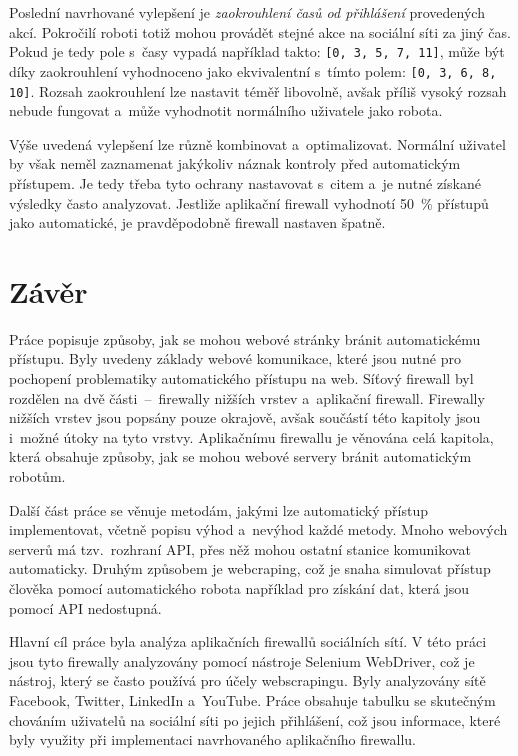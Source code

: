 Poslední navrhované vylepšení je \textit{zaokrouhlení časů od přihlášení} provedených akcí. Pokročilí roboti totiž mohou provádět stejné akce na sociální síti za jiný čas. Pokud je tedy pole s~časy vypadá například takto: \texttt{[0, 3, 5, 7, 11]}, může být díky zaokrouhlení vyhodnoceno jako ekvivalentní s~tímto polem: \texttt{[0, 3, 6, 8, 10]}. Rozsah zaokrouhlení lze nastavit téměř libovolně, avšak příliš vysoký rozsah nebude fungovat a~může vyhodnotit normálního uživatele jako robota.

Výše uvedená vylepšení lze různě kombinovat a~optimalizovat. Normální uživatel by však neměl zaznamenat jakýkoliv náznak kontroly před automatickým přístupem. Je tedy třeba tyto ochrany nastavovat s~citem a~je nutné získané výsledky často analyzovat. Jestliže aplikační firewall vyhodnotí 50~\% přístupů jako automatické, je pravděpodobně firewall nastaven špatně.

\chapter{Závěr}
Práce popisuje způsoby, jak se mohou webové stránky bránit automatickému přístupu. Byly uvedeny základy webové komunikace, které jsou nutné pro pochopení problematiky automatického přístupu na web. Síťový firewall byl rozdělen na dvě části~--~firewally nižších vrstev a~aplikační firewall. Firewally nižších vrstev jsou popsány pouze okrajově, avšak součástí této kapitoly jsou i~možné útoky na tyto vrstvy. Aplikačnímu firewallu je věnována celá kapitola, která obsahuje způsoby, jak se mohou webové servery bránit automatickým robotům.

Další část práce se věnuje metodám, jakými lze automatický přístup implementovat, včetně popisu výhod a~nevýhod každé metody. Mnoho webových serverů má tzv.~rozhraní API, přes něž mohou ostatní stanice komunikovat automaticky. Druhým způsobem je webcraping, což je snaha simulovat přístup člověka pomocí automatického robota například pro získání dat, která jsou pomocí API nedostupná.

Hlavní cíl práce byla analýza aplikačních firewallů sociálních sítí. V této práci jsou tyto firewally analyzovány pomocí nástroje Selenium WebDriver, což je nástroj, který se často používá pro účely webscrapingu. Byly analyzovány sítě Facebook, Twitter, LinkedIn a~YouTube. Práce obsahuje tabulku se skutečným chováním uživatelů na sociální síti po jejich přihlášení, což jsou informace, které byly využity při implementaci navrhovaného aplikačního firewallu.

